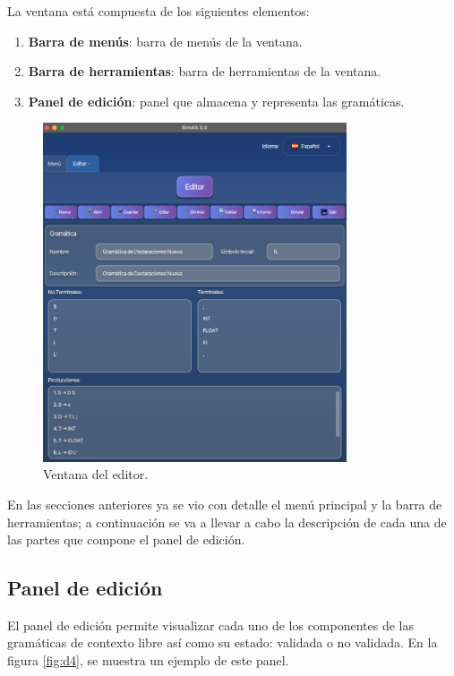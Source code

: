 La ventana está compuesta de los siguientes elementos:
\begin{enumerate}
 \item \textbf{Barra de menús}: barra de menús de la ventana.
 \item \textbf{Barra de herramientas}: barra de herramientas de la ventana.
 \item \textbf{Panel de edición}: panel que almacena y representa las gramáticas.
\end{enumerate}

\begin{figure}[htp]
\centering
	\includegraphics[width=0.8\textwidth]{figuras2/ejemplo_practico/editor.png}
	\caption{Ventana del editor.}
	\label{fig:d3}
\end{figure}

En las secciones anteriores ya se vio con detalle el menú principal y la barra de herramientas; a continuación se va a llevar a cabo la descripción de cada una de las partes que compone el panel de edición.

\subsection{Panel de edición}

El panel de edición permite visualizar cada uno de los componentes de las gramáticas de contexto libre así como su estado: validada o no validada. En la figura \ref{fig:d4}, se muestra un ejemplo de este panel.


